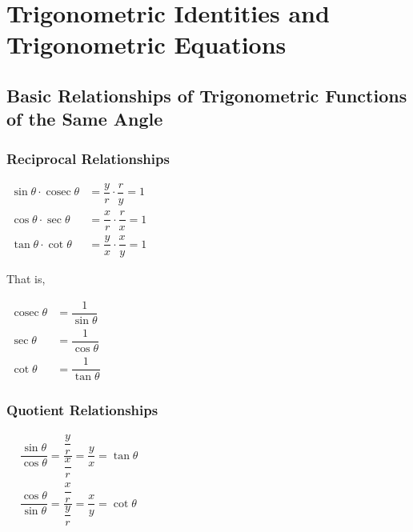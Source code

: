 \documentclass{report}
\begin{document}
\pagestyle{fancy}
\fancyhead{} %
\fancyhead[RO,LE]{\thepage}
\fancyhead[LO,RE]{\leftmark}
\fancyfoot{} %

\fancyfoot[RO,RE]{\thepage}

\onehalfspacing
\setcounter{chapter}{10}

\chapter{Trigonometric Identities and Trigonometric Equations}

\section{Basic Relationships of Trigonometric Functions of the Same Angle}

\subsection*{Reciprocal Relationships}
$\begin{aligned} \sin \theta \cdot \operatorname{cosec} \theta & =\dfrac{y}{r} \cdot \dfrac{r}{y}=1 \\ \cos \theta \cdot \sec \theta & =\dfrac{x}{r} \cdot \dfrac{r}{x}=1 \\ \tan \theta \cdot \cot \theta & =\dfrac{y}{x} \cdot \dfrac{x}{y}=1\end{aligned}$

\noindent That is,
\begin{info}
	
	$\begin{aligned} \operatorname{cosec} \theta&=\dfrac{1}{\sin \theta} \\ \sec \theta&=\dfrac{1}{\cos \theta} \\ \cot \theta&=\dfrac{1}{\tan \theta}\end{aligned}$
\end{info}

\subsection*{Quotient Relationships}
$\begin{aligned} & \dfrac{\sin \theta}{\cos \theta}=\dfrac{\dfrac{y}{r}}{\dfrac{x}{r}}=\dfrac{y}{x}=\tan \theta \\ & \dfrac{\cos \theta}{\sin \theta}=\dfrac{\dfrac{x}{r}}{\dfrac{y}{r}}=\dfrac{x}{y}=\cot \theta\end{aligned}$
\end{document}
